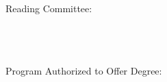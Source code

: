 \begin{titlepage}
    \begin{addmargin}[-1cm]{-3cm}
    \begin{center}
        \large

        \hfill

        \vfill

        \begingroup
            \color{CTtitle}\spacedallcaps{\myTitle} \\ \bigskip
        \endgroup

        \spacedlowsmallcaps{\myName} \\ \bigskip \bigskip \bigskip \bigskip
        \bigskip \bigskip

        \mySubtitle \\ \medskip
        \myDegree \\ \medskip
        \myUni \\
        \myTime \\  \bigskip \bigskip \bigskip \bigskip
        \bigskip \bigskip

        Reading Committee: \\ \medskip
        \myChair \\ \medskip
        \myOtherChair \\ \medskip
        \myFaculty \\ \bigskip \bigskip \bigskip \bigskip
        \bigskip \bigskip

        Program Authorized to Offer Degree: \\ \medskip
        \myDepartment \\

        \vfill

    \end{center}
  \end{addmargin}
\end{titlepage}
